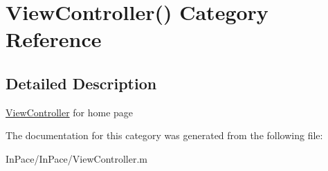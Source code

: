\hypertarget{categoryViewController_07_08}{\section{View\-Controller() Category Reference}
\label{categoryViewController_07_08}
}


\subsection{Detailed Description}
\hyperlink{interfaceViewController}{View\-Controller} for home page 

The documentation for this category was generated from the following file\-:\begin{DoxyCompactItemize}
\item 
In\-Pace/\-In\-Pace/View\-Controller.\-m\end{DoxyCompactItemize}
